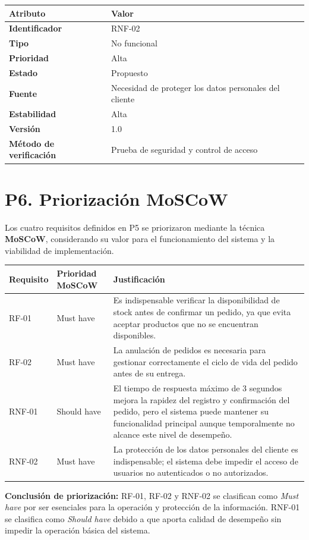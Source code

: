 \documentclass[12pt,a4paper]{article}
\newcommand{\reqtable}[7]{%
\begin{center}
\renewcommand{\arraystretch}{1.25}
\begin{tabularx}{0.95\textwidth}{|>{\bfseries}p{4.0cm}|X|}
\hline
\rowcolor{lightblue} Atributo & Valor \\
\hline
Identificador & #1 \\
\hline
Tipo & #2 \\
\hline
Prioridad & #3 \\
\hline
Estado & #4 \\
\hline
Fuente & #5 \\
\hline
Estabilidad & #6 \\
\hline
Versión & 1.0 \\
\hline
Método de verificación & #7 \\
\hline
\end{tabularx}
\end{center}}
\begin{document}
\reqtable{RNF-02}{No funcional}{Alta}{Propuesto}{Necesidad de proteger los datos personales del cliente}{Alta}{Prueba de seguridad y control de acceso}


\section{P6. Priorización MoSCoW}
Los cuatro requisitos definidos en P5 se priorizaron mediante la técnica \textbf{MoSCoW}, considerando su valor para el funcionamiento del sistema y la viabilidad de implementación.

\begin{center}
\renewcommand{\arraystretch}{1.3}
\small
\begin{tabularx}{\textwidth}{|p{2.2cm}|p{2.6cm}|X|}
\hline
\rowcolor{uteqblue}\color{white}\textbf{Requisito} & \color{white}\textbf{Prioridad MoSCoW} & \color{white}\textbf{Justificación} \\
\hline
RF-01 & Must have & Es indispensable verificar la disponibilidad de stock antes de confirmar un pedido, ya que evita aceptar productos que no se encuentran disponibles. \\
\hline
RF-02 & Must have & La anulación de pedidos es necesaria para gestionar correctamente el ciclo de vida del pedido antes de su entrega. \\
\hline
RNF-01 & Should have & El tiempo de respuesta máximo de 3 segundos mejora la rapidez del registro y confirmación del pedido, pero el sistema puede mantener su funcionalidad principal aunque temporalmente no alcance este nivel de desempeño. \\
\hline
RNF-02 & Must have & La protección de los datos personales del cliente es indispensable; el sistema debe impedir el acceso de usuarios no autenticados o no autorizados. \\
\hline
\end{tabularx}
\end{center}

\textbf{Conclusión de priorización:} RF-01, RF-02 y RNF-02 se clasifican como \textit{Must have} por ser esenciales para la operación y protección de la información. RNF-01 se clasifica como \textit{Should have} debido a que aporta calidad de desempeño sin impedir la operación básica del sistema.
\end{document}
